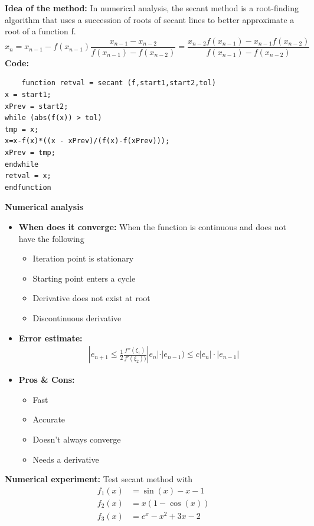 \documentclass{article}
\begin{document}
	{\bf Idea of the method:} 
	In numerical analysis, the secant method is a root-finding algorithm that uses a succession of roots of secant lines to better approximate a root of a function f. 
	\[x _ { n } = x _ { n - 1 } - f \left( x _ { n - 1 } \right) \frac { x _ { n - 1 } - x _ { n - 2 } } { f \left( x _ { n - 1 } \right) - f \left( x _ { n - 2 } \right) } = \frac { x _ { n - 2 } f \left( x _ { n - 1 } \right) - x _ { n - 1 } f \left( x _ { n - 2 } \right) } { f \left( x _ { n - 1 } \right) - f \left( x _ { n - 2 } \right) }\]
	{\bf Code:}
	\begin{verbatim}
    function retval = secant (f,start1,start2,tol)
x = start1;
xPrev = start2;
while (abs(f(x)) > tol)
tmp = x;
x=x-f(x)*((x - xPrev)/(f(x)-f(xPrev)));
xPrev = tmp;
endwhile
retval = x;
endfunction
	\end{verbatim}
	{\bf Numerical analysis}
	\begin{itemize}
		\item{\bf When does it converge:} When the function is continuous and does not have the following
		\begin{itemize}
			\item Iteration point is stationary
			\item Starting point enters a cycle
			\item Derivative does not exist at root
			\item Discontinuous derivative
		\end{itemize}
		\item {\bf Error estimate:}
		\begin{equation}
		\begin{split}
		& |e_{n+1}\leq \frac{1}{2}\frac{f''(\xi_1)}{f'(\xi_2))}|e_n|\cdot |e_{n-1}) \leq c|e_n|\cdot|e_{n-1}|
		\end{split}
		\end{equation}
		\item {\bf Pros \& Cons:}
		\begin{itemize}
			\item Fast
			\item Accurate
			\item Doesn't always converge
			\item Needs a derivative
		\end{itemize}
	\end{itemize}
	{\bf Numerical experiment:}
	Test secant method with 
	\begin{align*} f _ { 1 } ( x ) & = \sin ( x ) - x - 1 \\ f _ { 2 } ( x ) & = x ( 1 - \cos ( x ) ) \\ f _ { 3 } ( x ) & = e ^ { x } - x ^ { 2 } + 3 x - 2 \end{align*}
	
\end{document}

